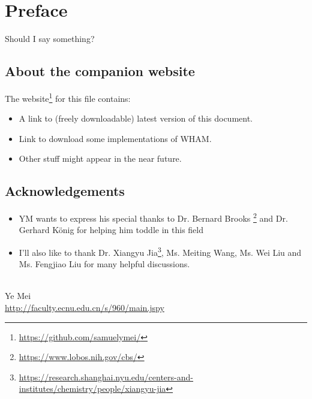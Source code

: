 \chapter*{Preface}
Should I say something?

\section*{About the companion website}
The website\footnote{\url{https://github.com/samuelymei/}} for this file contains:
\begin{itemize}
  \item A link to (freely downloadable) latest version of this document.
  \item Link to download some implementations of WHAM.
  \item Other stuff might appear in the near future.
\end{itemize}

\section*{Acknowledgements}
\begin{itemize}
\item YM wants to express his special thanks to Dr. Bernard Brooks \footnote{\url{https://www.lobos.nih.gov/cbs/}} and Dr. Gerhard K\"onig for helping him toddle in this field
\item I'll also like to thank Dr. Xiangyu Jia\footnote{\url{https://research.shanghai.nyu.edu/centers-and-institutes/chemistry/people/xiangyu-jia}}, Ms. Meiting Wang, Ms. Wei Liu and Ms. Fengjiao Liu for many helpful discussions.
\end{itemize}
\mbox{}\\
\noindent Ye Mei \\
\noindent \url{http://faculty.ecnu.edu.cn/s/960/main.jspy}
